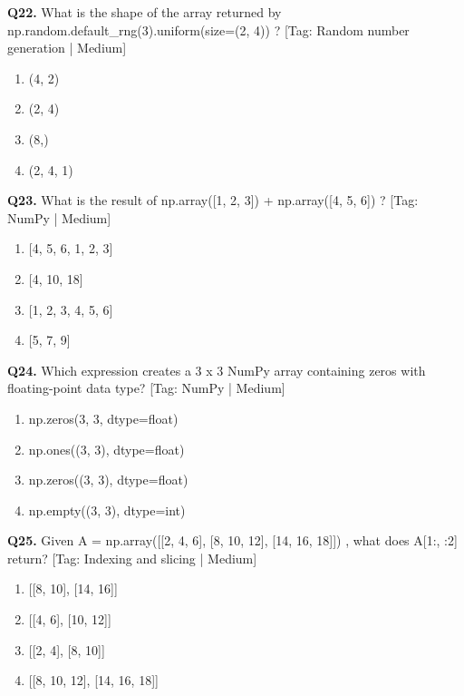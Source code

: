 \vspace{2mm}
\noindent\textbf{Q22.} What is the shape of the array returned by np.random.default\_rng(3).uniform(size=(2, 4)) ? \hfill [Tag: Random number generation | Medium]
\begin{enumerate}[label=(\alph*),topsep=2pt,itemsep=1pt,partopsep=0pt,parsep=0pt]
    \item {(4, 2)}
    \item {(2, 4)}
    \item {(8,)}
    \item {(2, 4, 1)}
\end{enumerate}
\vspace{2mm}
\noindent\textbf{Q23.} What is the result of np.array([1, 2, 3]) + np.array([4, 5, 6]) ? \hfill [Tag: NumPy | Medium]
\begin{enumerate}[label=(\alph*),topsep=2pt,itemsep=1pt,partopsep=0pt,parsep=0pt]
    \item {[4, 5, 6, 1, 2, 3]}
    \item {[4, 10, 18]}
    \item {[1, 2, 3, 4, 5, 6]}
    \item {[5, 7, 9]}
\end{enumerate}
\vspace{2mm}
\noindent\textbf{Q24.} Which expression creates a 3 x 3 NumPy array containing zeros with floating-point data type? \hfill [Tag: NumPy | Medium]
\begin{enumerate}[label=(\alph*),topsep=2pt,itemsep=1pt,partopsep=0pt,parsep=0pt]
    \item {np.zeros(3, 3, dtype=float)}
    \item {np.ones((3, 3), dtype=float)}
    \item {np.zeros((3, 3), dtype=float)}
    \item {np.empty((3, 3), dtype=int)}
\end{enumerate}
\vspace{2mm}
\noindent\textbf{Q25.} Given A = np.array([[2, 4, 6], [8, 10, 12], [14, 16, 18]]) , what does A[1:, :2] return? \hfill [Tag: Indexing and slicing | Medium]
\begin{enumerate}[label=(\alph*),topsep=2pt,itemsep=1pt,partopsep=0pt,parsep=0pt]
    \item {[[8, 10], [14, 16]]}
    \item {[[4, 6], [10, 12]]}
    \item {[[2, 4], [8, 10]]}
    \item {[[8, 10, 12], [14, 16, 18]]}
\end{enumerate}
